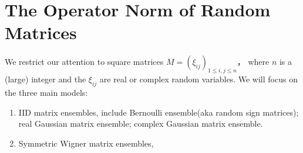 \part{The Operator Norm of Random Matrices}

We restrict our attention to square matrices $M=(\xi_{ij})_{1\leq i,j\leq n}$， where $n$ is a (large) integer and the $\xi_{ij}$ are real or complex random variables. We will focus on the three main models:
\begin{enumerate}
    \item IID matrix ensembles, include Bernoulli ensemble(aka random sign matrices); real Gaussian matrix ensemble; complex Gaussian matrix ensemble.
    \item Symmetric Wigner matrix ensembles, 
\end{enumerate}